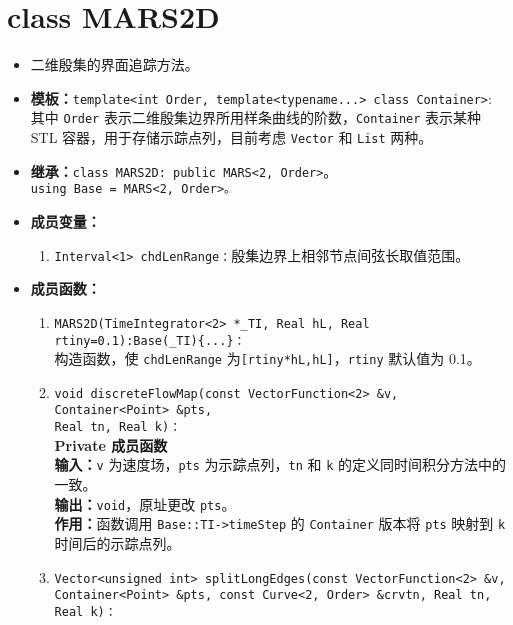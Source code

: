 \documentclass[a4paper,twoside]{ctexart}
\begin{document}
\section{class MARS2D}
\begin{itemize}
    \item 二维殷集的界面追踪方法。
    \item \textbf{模板：}\texttt{template<int Order, {\color{blue}template<typename...> class Container}>}:\\
    其中 \texttt{Order} 表示二维殷集边界所用样条曲线的阶数，{\color{blue}\texttt{Container} 表示某种 STL 容器，用于存储示踪点列，目前考虑 \texttt{Vector} 和 \texttt{List} 两种。}
    \item \textbf{继承：}\texttt{class MARS2D: public MARS<2, Order>}。\\
    \texttt{using Base = MARS<2, Order>。}
    \item \textbf{成员变量：}
            \begin{enumerate}[(1)]
                \item \texttt{Interval<1> chdLenRange：}殷集边界上相邻节点间弦长取值范围。
            \end{enumerate}
    \item \textbf{成员函数：}
            \begin{enumerate}[(1)]
                \item \texttt{MARS2D(TimeIntegrator<2> *\_TI, Real hL, Real rtiny=0.1):Base(\_TI)\{...\}：}\\
                构造函数，使 \texttt{chdLenRange} 为\texttt{[rtiny*hL,hL]}，\texttt{rtiny} 默认值为 0.1。
                \item \texttt{void discreteFlowMap(const VectorFunction<2> \&v, {\color{blue}Container<Point> \&pts}, \\Real tn, Real k)：}\\
                \textbf{Private 成员函数}\\
                \textbf{输入：}\texttt{v} 为速度场，\texttt{pts} 为示踪点列，\texttt{tn} 和 \texttt{k} 的定义同时间积分方法中的一致。\\
                \textbf{输出：}\texttt{void}，原址更改 \texttt{pts}。\\
                \textbf{作用：}函数调用 \texttt{Base::TI->timeStep} 的 \texttt{Container} 版本将 \texttt{pts} 映射到 \texttt{k} 时间后的示踪点列。
                \item \texttt{Vector<unsigned int> splitLongEdges(const VectorFunction<2> \&v, \\{\color{blue}Container<Point> \&pts}, const Curve<2, Order> \&crvtn, Real tn, Real k)：}\\

\end{enumerate}
\end{itemize}
\end{document}
